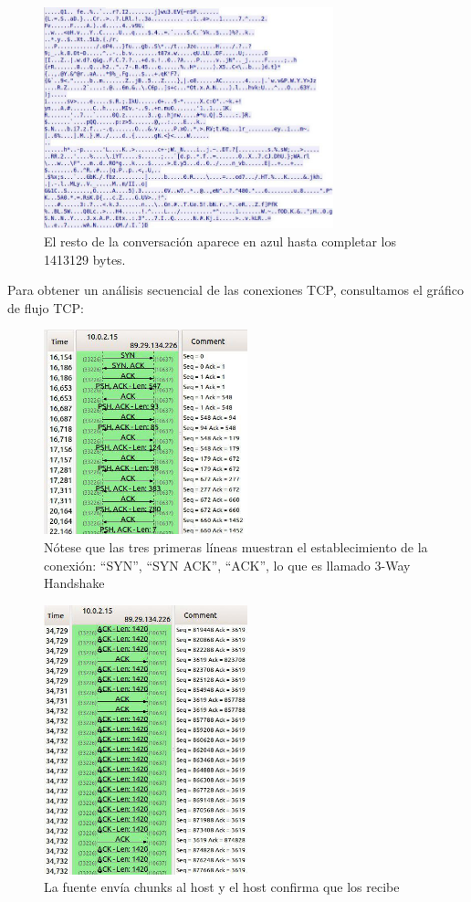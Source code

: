 \documentclass{article}
\begin{document}
\begin{figure}[H]
  \centering
  \includegraphics[width=84mm]{imagenes/trama_azul}
  \caption{El resto de la conversación aparece en azul hasta completar los 1413129 bytes.}
\end{figure}

Para obtener un análisis secuencial de las conexiones TCP, consultamos el gráfico de flujo TCP:

\begin{figure}[H]
  \centering
  \includegraphics[width=59mm]{imagenes/statistic_flow}
  \caption{Nótese que las tres primeras líneas muestran el establecimiento de la conexión: ``SYN'', ``SYN ACK'', ``ACK'', lo que es llamado 3-Way Handshake}
\end{figure}

\begin{figure}[H]
  \centering
  \includegraphics[width=59mm]{imagenes/statistic_flow1}
  \caption{La fuente envía chunks al host y el host confirma que los recibe}
\end{figure}
\end{document}
